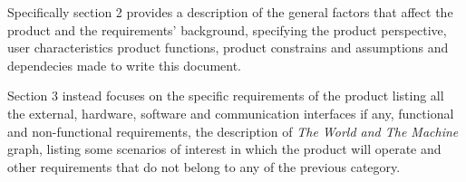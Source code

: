 		\indent Specifically section 2 provides a description of the general factors that affect the product and the requirements' background, specifying the product perspective, user characteristics product functions, product constrains and assumptions and dependecies made to write this document.
		
		\indent Section 3 instead focuses on the specific requirements of the product listing all the external, hardware, software and communication interfaces if any, functional and non-functional requirements, the description of \emph{The World and The Machine} graph, listing some scenarios of interest in which the product will operate and other requirements that do not belong to any of the previous category. 
	
	